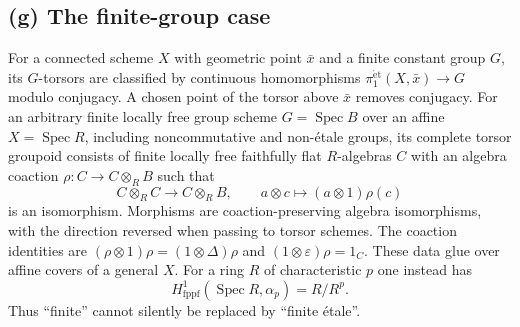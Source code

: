 \subsection{(g) The finite-group case}

\begin{proposition}
\label{geo-Kg}
For a connected scheme $X$ with geometric point $\bar x$ and a finite
constant group $G$, its $G$-torsors are classified by continuous
homomorphisms $\pi_1^{\mathrm{\acute et}}(X,\bar x)\to G$ modulo
conjugacy. A chosen point of the torsor above $\bar x$ removes conjugacy.
For an arbitrary finite locally free group scheme
$G=\operatorname{Spec}B$ over an affine $X=\operatorname{Spec}R$,
including noncommutative and non-\'{e}tale groups, its complete torsor
groupoid consists of finite locally free faithfully flat $R$-algebras $C$
with an algebra coaction $\rho:C\to C\otimes_R B$ such that
\[
 C\otimes_R C\longrightarrow C\otimes_R B,
 \qquad a\otimes c\longmapsto(a\otimes1)\rho(c)
\]
is an isomorphism. Morphisms are coaction-preserving algebra isomorphisms,
with the direction reversed when passing to torsor schemes.
The coaction identities are
$(\rho\otimes1)\rho=(1\otimes\Delta)\rho$ and
$(1\otimes\varepsilon)\rho=1_C$.
These data glue over affine covers of a general $X$.
For a ring $R$ of characteristic $p$ one instead has
\[
 H^1_{\mathrm{fppf}}(\operatorname{Spec}R,\alpha_p)=R/R^p.
\]
Thus ``finite'' cannot silently be replaced by ``finite \'etale''.
\end{proposition}
